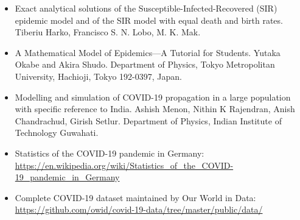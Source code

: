 \documentclass[12pt, a4paper]{article}
\begin{document}
	\begin{itemize}
		\item Exact analytical solutions of the Susceptible-Infected-Recovered (SIR) epidemic
		model and of the SIR model with equal death and birth rates. Tiberiu Harko, Francisco S. N. Lobo, M. K. Mak.

		\item A Mathematical Model of Epidemics—A Tutorial
		for Students. Yutaka Okabe and Akira Shudo. Department of Physics, Tokyo Metropolitan University, Hachioji, Tokyo 192-0397, Japan.

		\item Modelling and simulation of COVID-19 propagation in a large population with specific reference to India.
		Ashish Menon, Nithin K Rajendran, Anish Chandrachud, Girish Setlur. Department of Physics, Indian Institute of Technology Guwahati.

		\item Statistics of the COVID-19 pandemic in Germany: \url{https://en.wikipedia.org/wiki/Statistics_of_the_COVID-19_pandemic_in_Germany}

		\item Complete COVID-19 dataset maintained by Our World in Data: \url{https://github.com/owid/covid-19-data/tree/master/public/data/}
	\end{itemize}
\end{document}
